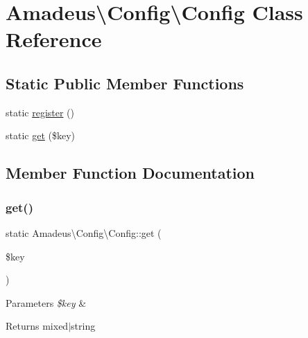\hypertarget{classAmadeus_1_1Config_1_1Config}{}\section{Amadeus\textbackslash{}Config\textbackslash{}Config Class Reference}
\label{classAmadeus_1_1Config_1_1Config}
\subsection*{Static Public Member Functions}
\begin{DoxyCompactItemize}
\item 
static \hyperlink{classAmadeus_1_1Config_1_1Config_a31fbcff959be2ea82854478f2b20125d}{register} ()
\item 
static \hyperlink{classAmadeus_1_1Config_1_1Config_af3e99ab0ac147c5eef9f0bcb759500d1}{get} (\$key)
\end{DoxyCompactItemize}


\subsection{Member Function Documentation}
\mbox{\label{classAmadeus_1_1Config_1_1Config_af3e99ab0ac147c5eef9f0bcb759500d1}} 
\subsubsection{\texorpdfstring{get()}{get()}}
{\footnotesize\ttfamily static Amadeus\textbackslash{}\+Config\textbackslash{}\+Config\+::get (\begin{DoxyParamCaption}\item[{}]{\$key }\end{DoxyParamCaption})\hspace{0.3cm}{\ttfamily [static]}}


\begin{DoxyParams}{Parameters}
{\em \$key} & \\
\hline
\end{DoxyParams}
\begin{DoxyReturn}{Returns}
mixed$\vert$string 
\end{DoxyReturn}
\mbox{\label{classAmadeus_1_1Config_1_1Config_a31fbcff959be2ea82854478f2b20125d}} 
